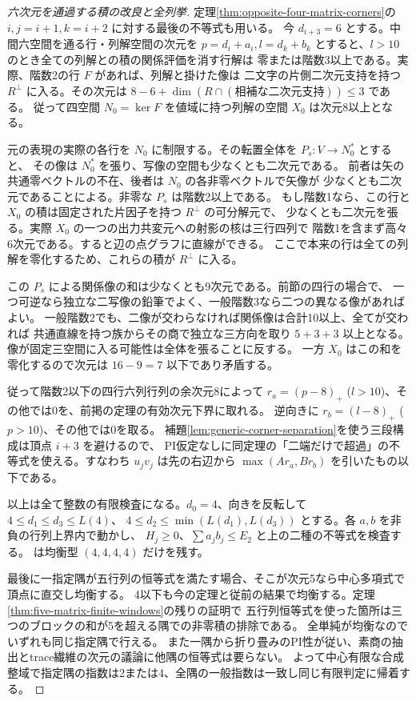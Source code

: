 \begin{proof}[六次元を通過する積の改良と全列挙]
定理\ref{thm:opposite-four-matrix-corners}の $i,j=i+1,k=i+2$ に対する最後の不等式も用いる。
今 $d_{i+3}=6$ とする。中間六空間を通る行・列解空間の次元を
$p=d_i+a_i,l=d_k+b_k$ とすると、$l>10$ のとき全ての列解との積の関係評価を消す行解は
零または階数3以上である。実際、階数2の行 $F$ があれば、列解と掛けた像は
二文字の片側二次元支持を持つ $R^\perp$ に入る。その次元は
$8-6+\dim(R\cap (\text{相補な二次元支持}))\le3$ である。
従って四空間 $N_0=\ker F$ を値域に持つ列解の空間 $X_0$ は次元8以上となる。

元の表現の実際の各行を $N_0$ に制限する。その転置全体を $P_s:V\to N_0^*$ とすると、
その像は $N_0^*$ を張り、写像の空間も少なくとも二次元である。
前者は矢の共通零ベクトルの不在、後者は $N_0$ の各非零ベクトルで矢像が
少なくとも二次元であることによる。非零な $P_s$ は階数2以上である。
もし階数1なら、この行と $X_0$ の積は固定された片因子を持つ $R^\perp$ の可分解元で、
少なくとも二次元を張る。実際 $X_0$ の一つの出力共変元への射影の核は三行四列で
階数1を含まず高々6次元である。すると辺の点グラフに直線ができる。
ここで本来の行は全ての列解を零化するため、これらの積が $R^\perp$ に入る。

この $P_s$ による関係像の和は少なくとも9次元である。前節の四行の場合で、
一つ可逆なら独立な二写像の鉛筆でよく、一般階数3なら二つの異なる像があればよい。
一般階数2でも、二像が交わらなければ関係像は合計10以上、全てが交われば
共通直線を持つ族からその商で独立な三方向を取り $5+3+3$ 以上となる。
像が固定三空間に入る可能性は全体を張ることに反する。
一方 $X_0$ はこの和を零化するので次元は $16-9=7$ 以下であり矛盾する。

従って階数2以下の四行六列行列の余次元8によって
$r_a=(p-8)_+$ ($l>10$)、その他では0を、前掲の定理の有効次元下界に取れる。
逆向きに $r_b=(l-8)_+$ ($p>10$)、その他では0を取る。
補題\ref{lem:generic-corner-separation}を使う三段構成は頂点 $i+3$ を避けるので、
PI仮定なしに同定理の「二端だけで超過」の不等式を使える。すなわち $u_jv_j$ は先の右辺から
$\max(A r_a,B r_b)$ を引いたもの以下である。

以上は全て整数の有限検査になる。$d_0=4$、向きを反転して $4\le d_1\le d_3\le L(4)$、
$4\le d_2\le\min(L(d_1),L(d_3))$ とする。各 $a,b$ を非負の行列上界内で動かし、
$H_j\ge0$、$\sum a_jb_j\le E_2$ と上の二種の不等式を検査する。
 は均衡型 $(4,4,4,4)$ だけを残す。

最後に一指定隅が五行列の恒等式を満たす場合、そこが次元5なら中心多項式で頂点に直交し均衡する。
4以下も今の定理と従前の結果で均衡する。定理\ref{thm:five-matrix-finite-windows}の残りの証明で
五行列恒等式を使った箇所は三つのブロックの和が5を超える隅での非零積の排除である。
全単純が均衡なのでいずれも同じ指定隅で行える。
また一隅から折り畳みのPI性が従い、素商の抽出とtrace繊維の次元の議論に他隅の恒等式は要らない。
よって中心有限な合成整域で指定隅の指数は2または4、全隅の一般指数は一致し同じ有限判定に帰着する。
\end{proof}
